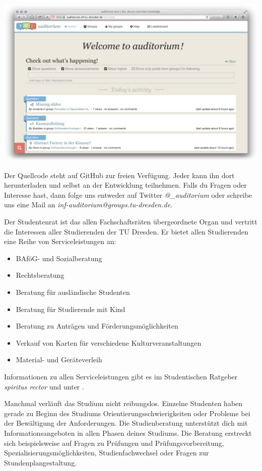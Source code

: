 {
\centering
\includegraphics[width=.75\linewidth]{img/auditorium.png}
\par
}

Der Quellcode steht auf GitHub  zur freien Verfügung.
Jeder kann ihn dort herunterladen und selbst an der Entwicklung teilnehmen.
Falls du Fragen oder Interesse hast, dann folge uns entweder auf Twitter \textit{@\_auditorium} oder schreibe uns eine Mail an \textit{inf-auditorium@groups.tu-dresden.de}.

\newpage

Der Studentenrat ist das allen Fachschaftsräten übergeordnete Organ und vertritt die Interessen aller Studierenden der TU Dresden. Er bietet allen Studierenden eine Reihe von Serviceleistungen an:
\begin{itemize}
\item BAföG- und Sozialberatung
\item Rechtsberatung
\item Beratung für ausländische Studenten
\item Beratung für Studierende mit Kind
\item Beratung zu Anträgen und Förderungsmöglichkeiten
\item Verkauf von Karten für verschiedene Kulturveranstaltungen
\item Material- und Geräteverleih
\end{itemize}

Informationen zu allen Serviceleistungen gibt es im Studentischen Ratgeber \textit{spiritus rector}  und unter .

Manchmal verläuft das Studium nicht reibungslos.
Einzelne Studenten haben gerade zu Beginn des Studiums Orientierungsschwierigkeiten oder Probleme bei der Bewältigung der Anforderungen.
Die Studienberatung unterstützt dich mit Informationsangeboten in allen Phasen deines Studiums.
Die Beratung erstreckt sich beispielsweise auf Fragen zu Prüfungen und Prüfungsvorbereitung, Spezialisierungsmöglichkeiten, Studienfachwechsel oder Fragen zur Stundenplangestaltung.

